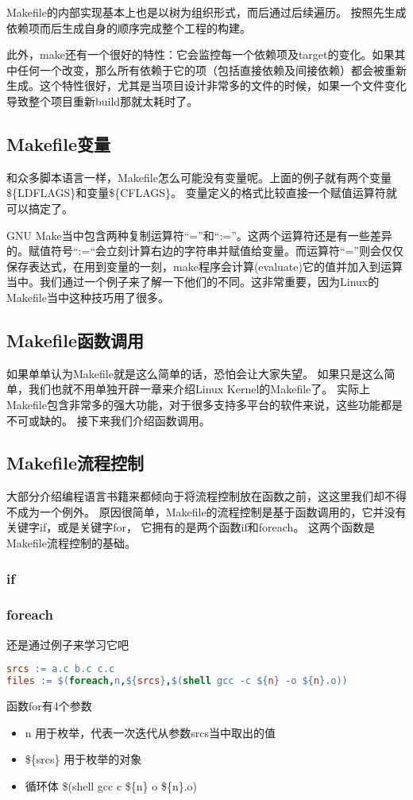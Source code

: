Makefile的内部实现基本上也是以树为组织形式，而后通过后续遍历。
按照先生成依赖项而后生成自身的顺序完成整个工程的构建。

此外，make还有一个很好的特性：它会监控每一个依赖项及target的变化。如果其中任何一个改变，那么所有依赖于它的项（包括直接依赖及间接依赖）都会被重新生成。这个特性很好，尤其是当项目设计非常多的文件的时候，如果一个文件变化导致整个项目重新build那就太耗时了。
\subsection{Makefile变量}
和众多脚本语言一样，Makefile怎么可能没有变量呢。上面的例子就有两个变量\$\{LDFLAGS\}和变量\$\{CFLAGS\}。
变量定义的格式比较直接一个赋值运算符就可以搞定了。

GNU Make当中包含两种复制运算符“=”和“:=”。这两个运算符还是有一些差异的。赋值符号“:=“会立刻计算右边的字符串并赋值给变量。而运算符“=”则会仅仅保存表达式，在用到变量的一刻，make程序会计算(evaluate)它的值并加入到运算当中。我们通过一个例子来了解一下他们的不同。这非常重要，因为Linux的Makefile当中这种技巧用了很多。

\subsection{Makefile函数调用}
如果单单认为Makefile就是这么简单的话，恐怕会让大家失望。
如果只是这么简单，我们也就不用单独开辟一章来介绍Linux Kernel的Makefile了。
实际上Makefile包含非常多的强大功能，对于很多支持多平台的软件来说，这些功能都是不可或缺的。
接下来我们介绍函数调用。
\subsection{Makefile流程控制}
大部分介绍编程语言书籍来都倾向于将流程控制放在函数之前，这这里我们却不得不成为一个例外。
原因很简单，Makefile的流程控制是基于函数调用的，它并没有关键字if，或是关键字for，
它拥有的是两个函数if和foreach。
这两个函数是Makefile流程控制的基础。
\subsubsection{if}
\subsubsection{foreach}
还是通过例子来学习它吧
\begin{lstlisting}[language=make]
srcs := a.c b.c c.c
files := $(foreach,n,${srcs},$(shell gcc -c ${n} -o ${n}.o))
\end{lstlisting}
函数for有4个参数
\begin{itemize}
\item n 用于枚举，代表一次迭代从参数srcs当中取出的值
\item \$\{srcs\} 用于枚举的对象
\item 循环体 \$(shell gcc \-c \$\{n\} \-o \$\{n\}.o) 
\end{itemize}
